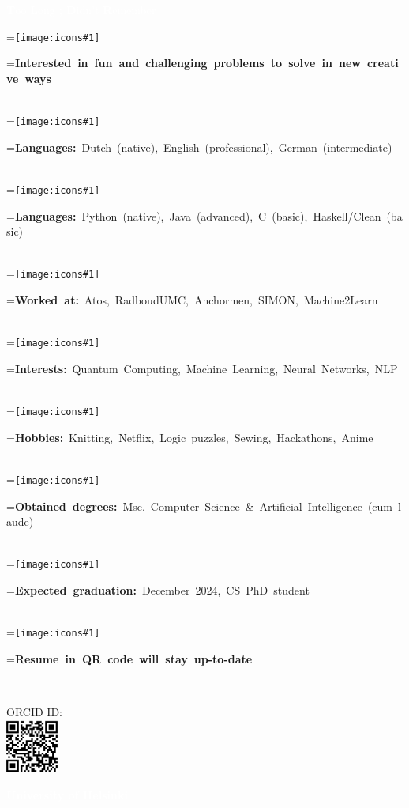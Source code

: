 \documentclass[8pt]{article}
\newcommand*{\vcenteredhbox}[1]{\begingroup
\setbox0=\hbox{#1}\parbox{\wd0}{\box0}\endgroup}
\newcommand{\icons}{Font-Awesome-SVG-PNG/}	%
\newcommand{\icon}[2]{\colorbox{secondcol}{\texttt{[image: \\icons\#1]}}}	%
\newcommand{\icontext}[4]{ 						%
	\vcenteredhbox{\icon{#1}{#2}}\hspace{#4} \vcenteredhbox{\textcolor{textcol}{#3}}
}
\begin{document}
\newpage
        \begin{center}
            \colorbox{maincol}{\large{\textcolor{white}{\textbf{T}}}\small{\textcolor{white}{oo}} \large{\textcolor{white}{\textbf{L}}}\small{\textcolor{white}{ong}} \large{\textcolor{white}{\textbf{; D}}}\small{\textcolor{white}{idn't}} \large{\textcolor{white}{\textbf{R}}}\small{\textcolor{white}{emember}}}\\
        \end{center}
        \ssmall
        \begin{flushleft}
            \icontext{square-solid}{5pt}{\textcolor{fourthcol}{\textbf{Interested in fun and challenging problems to solve in new creative ways}}}{3pt}\\[2pt]
            \icontext{square-solid}{5pt}{\textcolor{fourthcol}{\textbf{Languages:}} Dutch (native), English (professional), German (intermediate)}{3pt}\\[2pt]
            \icontext{square-solid}{5pt}{\textcolor{fourthcol}{\textbf{Languages:}} Python (native), Java (advanced), C (basic), Haskell/Clean (basic)}{3pt}\\[2pt]
            \icontext{square-solid}{5pt}{\textcolor{fourthcol}{\textbf{Worked at:}} Atos, RadboudUMC, Anchormen, SIMON, Machine2Learn}{3pt}\\[2pt]
            \icontext{square-solid}{5pt}{\textcolor{fourthcol}{\textbf{Interests:}} Quantum Computing, Machine Learning, Neural Networks, NLP}{3pt}\\[2pt]
            \icontext{square-solid}{5pt}{\textcolor{fourthcol}{\textbf{Hobbies:}} Knitting, Netflix, Logic puzzles, Sewing, Hackathons, Anime}{3pt}\\[2pt]
            \icontext{square-solid}{5pt}{\textcolor{fourthcol}{\textbf{Obtained degrees:}} Msc. Computer Science \& Artificial Intelligence (cum laude)}{3pt}\\[2pt]
            \icontext{square-solid}{5pt}{\textcolor{fourthcol}{\textbf{Expected graduation:}} December 2024, CS PhD student}{3pt}\\[2pt]
            \icontext{square-solid}{5pt}{\textcolor{fourthcol}{\textbf{Resume in QR code will stay up-to-date}} }{3pt}\\[2pt]
        \end{flushleft}
        \begin{flushright}
        \vspace{-25pt}
        ORCID ID:\\
			\includegraphics[height=50pt]{ORCID_QR_code.png}
        \end{flushright}
        \vspace{-25pt}
			\colorbox{thirdcol}{\hspace{3pt}\small{\textcolor{white}{\textbf{University of Helsinki}}\hspace{2pt}}}
\end{document}
